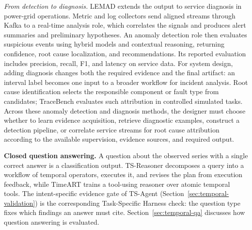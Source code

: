\documentclass[preprints,article,submit,moreauthors]{Definitions/mdpi}
\begin{document}
\textit{From detection to diagnosis.} LEMAD \citep{ji2025lemad} extends the output to service diagnosis in power-grid operations. Metric and log collectors send aligned streams through Kafka to a real-time analysis role, which correlates the signals and produces alert summaries and preliminary hypotheses. An anomaly detection role then evaluates suspicious events using hybrid models and contextual reasoning, returning confidence, root cause localization, and recommendations. Its reported evaluation includes precision, recall, F1, and latency on service data. For system design, adding diagnosis changes both the required evidence and the final artifact: an interval label becomes one input to a broader workflow for incident analysis. Root cause identification selects the responsible component or fault type from candidates; TraceBench \citep{tracebench2026} evaluates such attribution in controlled simulated tasks. Across these anomaly detection and diagnosis methods, the designer must choose whether to learn evidence acquisition, retrieve diagnostic examples, construct a detection pipeline, or correlate service streams for root cause attribution according to the available supervision, evidence sources, and required output.

\noindent\textbf{Closed question answering.} A question about the observed series with a single correct answer is a classification output. TS-Reasoner \citep{tsreasoner2026} decomposes a query into a workflow of temporal operators, executes it, and revises the plan from execution feedback, while TimeART \citep{timeart2026} trains a tool-using reasoner over atomic temporal tools. The intent-specific evidence gate of TS-Agent \citep{tsagent2025} (Section~\ref{sec:temporal-validation}) is the corresponding Task-Specific Harness check: the question type fixes which findings an answer must cite. Section~\ref{sec:temporal-qa} discusses how question answering is evaluated.
\end{document}
